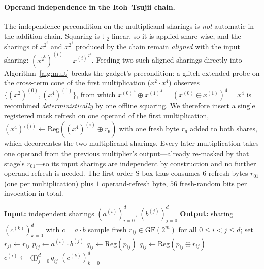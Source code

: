 \documentclass[lettersize,journal]{IEEEtran}
\newcommand{\GF}{\mathrm{GF}}
\newcommand{\share}[2]{#1^{(#2)}}
\begin{document}
\paragraph{Operand independence in the Itoh--Tsujii chain.}
The independence precondition on the multiplicand sharings is \emph{not}
automatic in the addition chain.  Squaring is $\mathbb{F}_2$-linear, so it
is applied share-wise, and the sharings of $x^{2^i}$ and $x^{2^j}$ produced
by the chain remain \emph{aligned} with the input sharing:
$\share{(x^{2^k})}{i}=\share{x}{i}^{\,2^k}$.  Feeding two such aligned
sharings directly into Algorithm~\ref{alg:mult} breaks the gadget's
precondition: a glitch-extended probe on the cross-term cone of the first
multiplication ($x^{2}{\cdot}x^{4}$) observes
$\{\share{(x^{2})}{0},\share{(x^{4})}{1}\}$, from which
$\share{x}{0}^{\,4}\oplus\share{x}{1}^{\,4}=(\share{x}{0}\oplus
\share{x}{1})^{4}=x^{4}$ is recombined \emph{deterministically} by one
offline squaring.  We therefore insert a single registered mask refresh on
one operand of the first multiplication,
$\share{(x^{4})'}{i}\leftarrow\mathrm{Reg}(\share{(x^{4})}{i}\oplus r_6)$
with one fresh byte $r_6$ added to both shares, which decorrelates the two
multiplicand sharings.  Every later multiplication takes one operand from
the previous multiplier's output---already re-masked by that stage's
$r_{01}$---so its input sharings are independent by construction and no
further operand refresh is needed.  The first-order S-box thus consumes
$6$ refresh bytes $r_{01}$ (one per multiplication) plus $1$ operand-refresh
byte, $56$ fresh-random bits per invocation in total.

\begin{algorithm}[t]
\caption{Proposed order-$d$ masked multiplier}
\label{alg:mult}
\begin{algorithmic}[1]
\STATE \textbf{Input:} independent sharings $(\share{a}{i})_{i=0}^{d}$, $(\share{b}{j})_{j=0}^{d}$
\STATE \textbf{Output:} sharing $(\share{c}{k})_{k=0}^{d}$ with $c = a \cdot b$
\STATE sample fresh $r_{ij}\in\GF(2^m)$ for all $0\le i<j\le d$; set $r_{ji}\leftarrow r_{ij}$
    \STATE $p_{ij} \leftarrow \share{a}{i} \cdot \share{b}{j}$ 
      \STATE $q_{ij} \leftarrow \mathrm{Reg}(p_{ij})$
    \ELSE
      \STATE $q_{ij} \leftarrow \mathrm{Reg}(p_{ij} \oplus r_{ij})$ 
    \ENDIF
  \ENDFOR
\ENDFOR
{}
  \STATE $\share{c}{i} \leftarrow \bigoplus_{j=0}^{d} q_{ij}$ 
\ENDFOR
\RETURN $(\share{c}{k})_{k=0}^{d}$
\end{algorithmic}
\end{algorithm}
\end{document}
